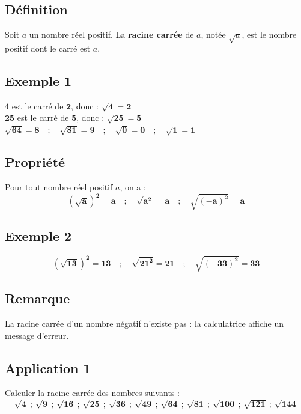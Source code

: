 \documentclass[12pt,a4paper]{article}
\begin{document}
\subsection*{\color{myred} Définition}
Soit $a$ un nombre réel positif. La \textbf{racine carrée} de $a$, notée $\sqrt{a}$, est le nombre positif dont le carré est $a$.
\subsection*{\color{myred} Exemple 1}
$4$ est le carré de $\mathbf{2}$, donc : $\mathbf{\sqrt{4} = 2}$ \\[0.2cm]
$\mathbf{25}$ est le carré de $\mathbf{5}$, donc : $\mathbf{\sqrt{25} = 5}$ \\[0.2cm]
$\mathbf{\sqrt{64} = 8 \quad ; \quad \sqrt{81} = 9 \quad ; \quad \sqrt{0} = 0 \quad ; \quad \sqrt{1} = 1}$
\subsection*{\color{myred} Propriété}
Pour tout nombre réel positif $a$, on a :
\[
\mathbf{(\sqrt{a})^2 = a \quad ; \quad \sqrt{a^2} = a \quad ; \quad \sqrt{(-a)^2} = a}
\]
\subsection*{\color{myred} Exemple 2}
\[
\mathbf{(\sqrt{13})^2 = 13 \quad ; \quad \sqrt{21^2} = 21 \quad ; \quad \sqrt{(-33)^2} = 33}
\]
\subsection*{\color{myred} Remarque}
\noindent
La racine carrée d'un nombre négatif n'existe pas : la calculatrice affiche un message d'erreur.

\vspace{0.3cm}
\begin{center}
\end{center}
\subsection*{\color{myred} Application 1}
\noindent
Calculer la racine carrée des nombres suivants :
\[
\mathbf{\sqrt{4} \ ; \ \sqrt{9} \ ; \ \sqrt{16} \ ; \ \sqrt{25} \ ; \ \sqrt{36} \ ; \ \sqrt{49} \ ; \ \sqrt{64} \ ; \ \sqrt{81} \ ; \ \sqrt{100} \ ; \ \sqrt{121} \ ; \ \sqrt{144}}
\]
\end{document}
